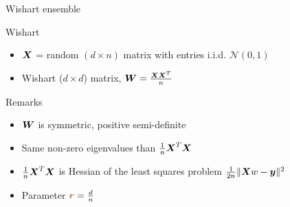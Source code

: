 \documentclass[10pt, aspectratio=169]{beamer}
\begin{document}
    

\begin{frame}[fragile]{Wishart ensemble}
 \begin{alertblock}{Wishart} 
\begin{itemize}
    \item ${\boldsymbol X}$ = random $(d \times n)$ matrix with entries i.i.d. $\mathcal{N}(0,1)$
    \item Wishart ($d \times d$) matrix, ${\boldsymbol W} = \frac{{\boldsymbol X} {\boldsymbol X}^T}{n}$
\end{itemize}
\end{alertblock}

\vspace{0.25cm}
 \begin{exampleblock}{Remarks}
 \begin{itemize}
     \item ${\boldsymbol W}$ is symmetric, positive semi-definite
     \pause\item Same non-zero eigenvalues than $\frac{1}{n}{\boldsymbol X}^T {\boldsymbol X}$
     \pause\item$\frac{1}{n}{\boldsymbol X}^T {\boldsymbol X}$ is Hessian of the least squares problem $\frac{1}{2 n}\|{\boldsymbol X} w - {\boldsymbol y}\|^2$
     \pause\item Parameter ${\color{mybrown}\boldsymbol r} = \frac{d}{n}$
\end{itemize}
 \end{exampleblock}
 
 
\end{frame}
\end{document}
